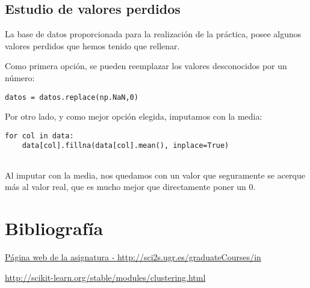 	
	
	
	\subsection{Estudio de valores perdidos}
	La base de datos proporcionada para la realización de la práctica, posee algunos valores perdidos que hemos tenido que rellenar.
	
	Como primera opción, se pueden reemplazar los valores desconocidos por un número:
	\begin{lstlisting}[frame=single]
datos = datos.replace(np.NaN,0)
	\end{lstlisting}
	
	Por otro lado, y como mejor opción elegida, imputamos con la media:
	
	\begin{lstlisting}[frame=single]
for col in data:
	data[col].fillna(data[col].mean(), inplace=True)
	
	\end{lstlisting}
	
	Al imputar con la media, nos quedamos con un valor que seguramente se acerque más al valor real, que es mucho mejor que directamente poner un 0.
	
	
	
	
	
	
	\newpage
	
	\section{Bibliografía}
	
	
	
	
	
	

	
	
	
	\begin{thebibliography}{9}
		
		
	\href{}{Página web de la asignatura - http://sci2s.ugr.es/graduateCourses/in}
		
	\href{}{http://scikit-learn.org/stable/modules/clustering.html}
	
		
		
			
	
		
		
		
		\end{thebibliography}
	
	
	
	

		
	